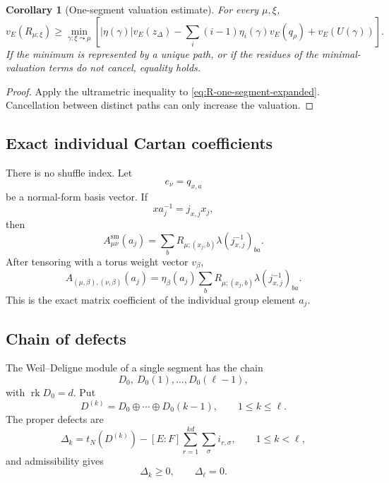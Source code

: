 \documentclass[12pt]{article}
\newtheorem{corollary}[theorem]{Corollary}
\theoremstyle{definition}
\theoremstyle{remark}
\begin{document}
\begin{corollary}[One-segment valuation estimate]
\label{cor:one-segment-path-valuation}
For every \(\mu,\xi\),
\begin{equation}\label{eq:R-one-segment-valuation}
 v_E(R_{\mu;\xi})
 \geq
 \min_{\gamma:\xi\leadsto\mu}
 \left[
 |\eta(\gamma)|v_E(z_\Delta)
 -
 \sum_i(i-1)\eta_i(\gamma)v_E(q_\rho)
 +
 v_E(U(\gamma))
 \right].
\end{equation}
If the minimum is represented by a unique path, or if the residues of the
minimal-valuation terms do not cancel, equality holds.
\end{corollary}

\begin{proof}
Apply the ultrametric inequality to
\eqref{eq:R-one-segment-expanded}.  Cancellation between distinct paths can
only increase the valuation.
\end{proof}

\subsection{Exact individual Cartan coefficients}

There is no shuffle index.  Let
\[
 e_\nu=q_{x,a}
\]
be a normal-form basis vector.  If
\[
 xa_j^{-1}=j_{x,j}x_j,
\]
then
\begin{equation}\label{eq:one-segment-smooth-A}
 \boxed{
 A^{\mathrm{sm}}_{\mu\nu}(a_j)
 =
 \sum_b
 R_{\mu;(x_j,b)}
 \lambda(j_{x,j}^{-1})_{ba}.
 }
\end{equation}
After tensoring with a torus weight vector \(v_\beta\),
\begin{equation}\label{eq:one-segment-locally-algebraic-A}
 \boxed{
 A_{(\mu,\beta),(\nu,\beta)}(a_j)
 =
 \eta_\beta(a_j)
 \sum_b
 R_{\mu;(x_j,b)}
 \lambda(j_{x,j}^{-1})_{ba}.
 }
\end{equation}
This is the exact matrix coefficient of the individual group element
\(a_j\).


\subsection{Chain of defects}

The Weil--Deligne module of a single segment has the chain
\[
 D_0,\ D_0(1),\ldots,D_0(\ell-1),
\]
with \(\operatorname{rk}D_0=d\).  Put
\[
 D^{(k)}
 =
 D_0\oplus\cdots\oplus D_0(k-1),
 \qquad
 1\leq k\leq\ell.
\]
The proper defects are
\begin{equation}\label{eq:one-segment-defects}
 \Delta_k
 =
 t_N(D^{(k)})
 -
 [E:F]
 \sum_{r=1}^{kd}\sum_\sigma i_{r,\sigma},
 \qquad
 1\leq k<\ell,
\end{equation}
and admissibility gives
\[
 \Delta_k\geq0,
 \qquad
 \Delta_\ell=0.
\]
\end{document}
